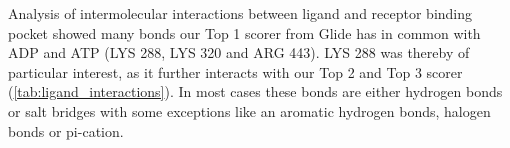 \documentclass[11pt, letterpaper, titlepage]{article}
\begin{document}
Analysis of intermolecular interactions between ligand and receptor binding pocket showed many bonds our Top 1 scorer from Glide has in common with ADP and ATP (LYS 288, LYS 320 and ARG 443). LYS 288 was thereby of particular interest, as it further interacts with our Top 2 and Top 3 scorer (\autoref{tab:ligand_interactions}). In most cases these bonds are either hydrogen bonds or salt bridges with some exceptions like an aromatic hydrogen bonds, halogen bonds or pi-cation.
%

\end{document}
